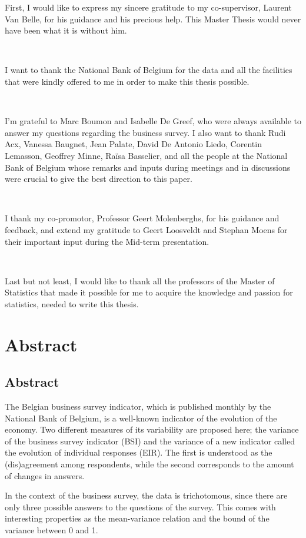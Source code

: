 \documentclass[12pt,a4paper,oneside]{book}
\begin{document}
First, I would like to express my sincere gratitude to my co-supervisor, Laurent Van Belle, for his guidance and his precious help. This Master Thesis would never have been what it is without him. 

\ 

I want to thank the National Bank of Belgium for the data and all the facilities that were kindly offered to me in order to make this thesis possible.

\

I'm grateful to Marc Boumon and Isabelle De Greef, who were always available to answer my questions regarding the business survey. 
I also want to thank Rudi Acx, 
Vanessa Baugnet, 
Jean Palate, 
David De Antonio Liedo, 
Corentin Lemasson,
Geoffrey Minne,
Raïsa Basselier,
and all the people at the National Bank of Belgium whose remarks and inputs during meetings and in discussions were crucial to give the best direction to this paper. 

\

I thank my co-promotor, Professor Geert Molenberghs, for his guidance and feedback, and extend my gratitude to Geert Loosveldt and Stephan Moens for their important input during the Mid-term presentation.

\

Last but not least, I would like to thank all the professors of the Master of Statistics that made it possible for me to acquire the knowledge and passion for statistics, needed to write this thesis. 


\chapter*{Abstract}



\section*{Abstract}

The Belgian business survey indicator, which is published monthly by the National Bank of Belgium, is a well-known indicator of the evolution of the economy. Two different measures of its variability are proposed here; the variance of the business survey indicator (BSI) and the variance of a new indicator called the evolution of individual responses (EIR). The first is understood as the (dis)agreement among respondents, while the second corresponds to the amount of changes in answers.

In the context of the business survey, the data is trichotomous, since there are only three possible answers to the questions of the survey. This comes with interesting properties as the mean-variance relation and the bound of the variance between 0 and 1.
\end{document}
